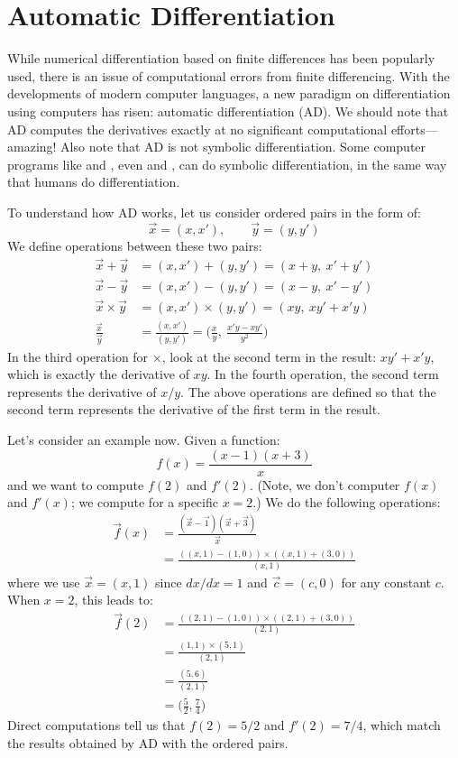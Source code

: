 \section{Automatic Differentiation}

While numerical differentiation based on finite differences has been popularly used, there is an issue of computational errors from finite differencing. With the developments of modern computer languages, a new paradigm on differentiation using computers has risen: automatic differentiation (AD). We should note that AD computes the derivatives exactly at no significant computational efforts---amazing! Also note that AD is not symbolic differentiation. Some computer programs like  and , even  and \julia{}, can do symbolic differentiation, in the same way that humans do differentiation.

To understand how AD works, let us consider ordered pairs in the form of:
\[
	\vec{x} = (x, x'), \qquad \vec{y} = (y, y')
\]
We define operations between these two pairs:
\begin{align*}
	\vec{x} + \vec{y} &= (x, x') + (y, y') = (x+y, \: x'+y') \\
	\vec{x} - \vec{y} &= (x, x') - (y, y') = (x-y, \: x'-y') \\
	\vec{x} \times \vec{y} &= (x, x') \times (y, y') = (xy, \: xy' + x'y) \\
	\frac{\vec{x}}{\vec{y}} &= \frac{(x, x')}{(y, y')} = \bigg( \frac{x}{y}, \: \frac{x'y - xy'}{y^2} \bigg)
\end{align*}
In the third operation for $\times$, look at the second term in the result: $xy'+x'y$, which is exactly the derivative of $xy$. In the fourth operation, the second term represents the derivative of $x/y$. The above operations are defined so that the second term represents the derivative of the first term in the result.

Let's consider an example now. Given a function:
\[
	f(x) = \frac{(x-1)(x+3)}{x}
\]
and we want to compute $f(2)$ and $f'(2)$. (Note, we don't computer $f(x)$ and $f'(x)$; we compute for a specific $x=2$.) We do the following operations:
\begin{align*}
\vec{f}(x) & = \frac{(\vec{x}-\vec{1})(\vec{x}+\vec{3})}{\vec{x}} \\
 &= \frac{ ( (x,1)-(1,0) ) \times ( (x,1)+(3,0) ) }{  (x,1) }
\end{align*}
where we use $\vec{x}=(x,1)$ since $dx/dx=1$ and $\vec{c}=(c,0)$ for any constant $c$. When $x=2$, this leads to:
\begin{align*}
\vec{f}(2) &= \frac{ ( (2,1)-(1,0) ) \times ( (2,1)+(3,0) ) }{  (2,1) }  \\
	&= \frac{ (1,1) \times (5,1) }{ (2,1) }  \\
	&= \frac{ (5,6) }{ (2,1) }  \\
	&= \bigg( \frac{5}{2}, \frac{7}{4}  \bigg)
\end{align*}
Direct computations tell us that $f(2)=5/2$ and $f'(2)=7/4$, which match the results obtained by AD with the ordered pairs.

